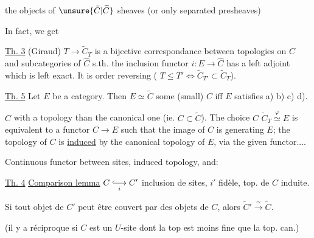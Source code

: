 the objects of $\unsure{\bar C|\widetilde C}$  sheaves (or only separated presheaves)

In fact, we get

\uline{Th. 3} (Giraud) $T\longrightarrow\widetilde C_T$ is a bijective correspondance between topologies on $C$ and  subcategories  of $\widehat C$ s.th. the inclusion functor $i\colon E\longrightarrow\widehat C$ has a left adjoint which is left exact. It is order reversing ( $T\leq T'\Longleftrightarrow\widetilde C_{T'}\subset\widetilde C_T$).

\uline{Th. 5} Let $E$ be a category. Then $E\simeq\widetilde C$ some (small) $C$ iff $E$ satisfies a) b) c) d).

   $C$ with a topology   than the canonical one (ie. $C\subset\widetilde C$). The choice   $C$    $\widetilde C_T\overset{\varphi}{\simeq}E$ is equivalent  to a   functor $C\longrightarrow E$ such that the image of $C$ is generating $E$; the topology  of $C$ is \uline{induced} by the canonical topology of $E$, via the given functor....

Continuous functor between sites, induced topology, and:


\uline{Th. 4} \uline{Comparison lemma} $C\underset{i}{\lhook\joinrel\longrightarrow}C'$  inclusion de sites, $i'$  fidèle, top. de $C$ induite.

Si tout objet de $C'$ peut être couvert par des objets de $C$, alors $\widetilde C'\xrightarrow{\simeq}\widetilde C$.

(il y a réciproque si $C$ est un $U$-site dont la top est moins fine que la top. can.)

